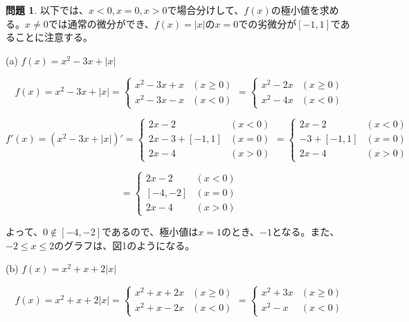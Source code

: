 \documentclass[titlepage]{jsarticle}
\theoremstyle{definition}
\newtheorem{Ex}{問題}
\theoremstyle{mystyle} %
\begin{document}
\begin{Ex}
以下では、$x<0, x=0, x>0$で場合分けして、$f(x)$の極小値を求める。$x\ne0$では通常の微分ができ、$f(x)=|x|$の$x=0$での劣微分が$[-1, 1]$であることに注意する。

\noindent(a) $f(x)=x^2-3x+|x|$

\begin{equation*}
f(x)=x^2-3x+|x|=
  \begin{cases}
  x^2-3x+x &  (x\geq0)\\
  x^2-3x-x &  (x<0)
  \end{cases}
=
  \begin{cases}
  x^2-2x &  (x\geq0)\\
  x^2-4x &  (x<0)
  \end{cases}
\end{equation*}

\begin{equation*}
f'(x)=(x^2-3x+|x|)'=
  \begin{cases}
  2x-2 &  (x<0)\\
  2x-3+[-1, 1] &  (x=0)\\
  2x-4 & (x>0)
  \end{cases}
=
  \begin{cases}
  2x-2 &  (x<0)\\
  -3+[-1, 1] &  (x=0)\\
  2x-4 & (x>0)
  \end{cases}
\end{equation*}

\begin{equation*}
  =
  \begin{cases}
  2x-2 &  (x<0)\\
  [-4, -2] &  (x=0)\\
  2x-4 & (x>0)
  \end{cases}
\end{equation*}

よって、$0\notin[-4, -2]$であるので、極小値は$x=1$のとき、$-1$となる。また、$-2\leq x \leq2$のグラフは、図1のようになる。

\noindent(b) $f(x)=x^2+x+2|x|$

\begin{equation*}
f(x)=x^2+x+2|x|=
  \begin{cases}
  x^2+x+2x &  (x\geq0)\\
  x^2+x-2x &  (x<0)
  \end{cases}
=
  \begin{cases}
  x^2+3x &  (x\geq0)\\
  x^2-x &  (x<0)
  \end{cases}
\end{equation*}


\end{Ex}
\end{document}
